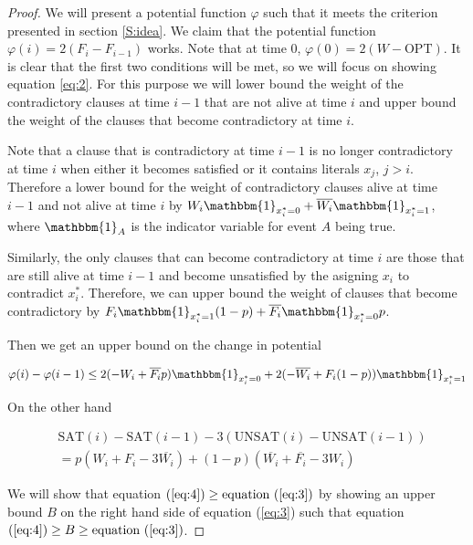 \documentclass[11pt,letter]{article}
\numberwithin{theorem}{section}
\renewcommand{\phi}{\varphi}
\begin{document}
\begin{proof}
We will present a potential function $\phi$ such that it meets the criterion presented in section \ref{S:idea}. We claim that the potential function 
$\phi(i) = 2(F_i - F_{i-1})$ works. Note that at time $0$,
 $\phi(0) = 2(W-\textrm{OPT})$. It is clear that the first two conditions will be met, so we will focus on showing equation \ref{eq:2}.
 For this purpose we will lower bound the weight of the contradictory clauses at time $i-1$ that are not alive at time $i$
 and upper bound the weight of the clauses that become contradictory at time $i$.

Note that a clause that is contradictory at time $i-1$ is no longer contradictory at time $i$ when either it becomes satisfied
or it contains literals $x_j$, $j > i$. Therefore a lower bound for the weight of contradictory clauses alive at time $i-1$ and
 not alive at time $i$ by $W_i \mathbbm{1}_{x_i^* = 0} + \overline{W_i} \mathbbm{1}_{x_i^* = 1}$, where $\mathbbm{1}_A$ is the indicator variable for event $A$ being true.

Similarly, the only clauses that can become contradictory at time $i$ are those that are still alive at time $i-1$ and become unsatisfied
 by the asigning $x_i$ to contradict $x_i^*$. Therefore, we can upper bound the weight of clauses that become contradictory by
 $F_i \mathbbm{1}_{x_i^* = 1} (1-p) + \overline{F_i} \mathbbm{1}_{x_i^* = 0}p$.

Then we get an upper bound on the change in potential

\begin{equation}
\label{eq:3}
\phi(i) - \phi(i-1) \leq 2(-W_i + \overline{F_i} p) \mathbbm{1}_{x_i^* = 0} + 2(-\overline{W_i} + F_i(1-p))\mathbbm{1}_{x_i^* = 1}
\end{equation}

On the other hand

\begin{equation}
\begin{aligned}
\label{eq:4}
& \textrm{SAT}(i) - \textrm{SAT}(i-1) - 3(\textrm{UNSAT}(i) - \textrm{UNSAT}(i-1)) \\
& = p(W_i + F_i - 3\overline{W_i}) + (1-p)(\overline{W_i} + \overline{F_i} - 3W_i)
\end{aligned}
\end{equation}

We will show that equation $(\ref{eq:4}) \geq \text{equation } (\ref{eq:3})$ by showing an upper bound $B$ on the right hand side of equation (\ref{eq:3}) such that equation $(\ref{eq:4}) \geq B \geq \text{equation } (\ref{eq:3})$.


\end{proof}
\end{document}
